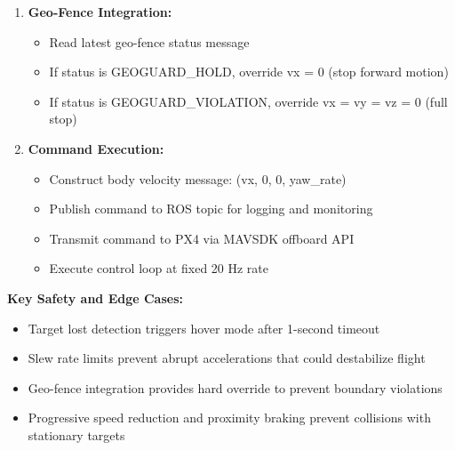 \documentclass[12pt,a4paper]{report}
\begin{document}
\begin{enumerate}
    \item \textbf{Geo-Fence Integration:}
    \begin{itemize}
        \item Read latest geo-fence status message
        \item If status is GEOGUARD\_HOLD, override vx = 0 (stop forward motion)
        \item If status is GEOGUARD\_VIOLATION, override vx = vy = vz = 0 (full stop)
    \end{itemize}
    \item \textbf{Command Execution:}
    \begin{itemize}
        \item Construct body velocity message: (vx, 0, 0, yaw\_rate)
        \item Publish command to ROS topic for logging and monitoring
        \item Transmit command to \ac{PX4} via \ac{MAVSDK} offboard API
        \item Execute control loop at fixed 20 Hz rate
    \end{itemize}
\end{enumerate}
\textbf{Key Safety and Edge Cases:}
\begin{itemize}
    \item Target lost detection triggers hover mode after 1-second timeout
    \item Slew rate limits prevent abrupt accelerations that could destabilize flight
    \item Geo-fence integration provides hard override to prevent boundary violations

    \item Progressive speed reduction and proximity braking prevent collisions with stationary targets
\end{itemize}
\end{document}
